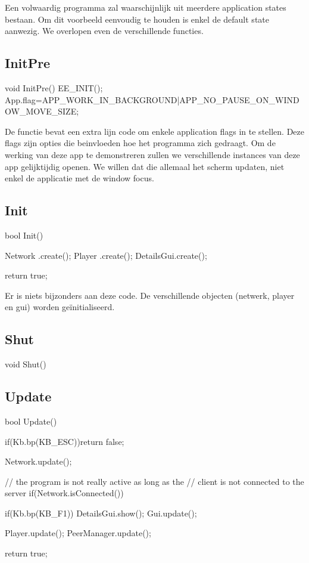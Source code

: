 Een volwaardig programma zal waarschijnlijk uit meerdere application states bestaan. Om dit voorbeeld eenvoudig te houden is enkel de default state aanwezig. We overlopen even de verschillende functies.

\subsection{InitPre}

\begin{code}
void InitPre()
{
   EE_INIT();
   App.flag=APP_WORK_IN_BACKGROUND|APP_NO_PAUSE_ON_WINDOW_MOVE_SIZE;
}
\end{code}

De  functie bevat een extra lijn code om enkele application flags in te stellen. Deze flags zijn opties die beinvloeden hoe het programma zich gedraagt. Om de werking van deze app te demonstreren zullen we verschillende instances van deze app gelijktijdig openen. We willen dat die allemaal het scherm updaten, niet enkel de applicatie met de window focus.

\subsection{Init}
\begin{code}
bool Init()
{
   Network   .create();
   Player    .create();
   DetailsGui.create();
   
   return true;
}
\end{code}

Er is niets bijzonders aan deze code. De verschillende objecten (netwerk, player en gui) worden ge\"initialiseerd.

\subsection{Shut}
\begin{code}
void Shut() {}
\end{code}

\subsection{Update}
\begin{code}
bool Update()
{
   if(Kb.bp(KB_ESC))return false;
   
   Network.update();
   
   // the program is not really active as long as the 
   // client is not connected to the server
   if(Network.isConnected())
   {
      if(Kb.bp(KB_F1)) DetailsGui.show();
      Gui.update();
      
      Player.update();
      PeerManager.update();
   }
   return true;
}
\end{code}

